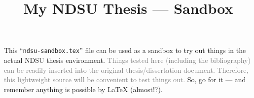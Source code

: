\documentclass[12pt,chapterrefs]{ndsu-thesis-2022}
\title{\vspace{-9pt}My NDSU Thesis --- Sandbox}
\begin{document}

This ``\texttt{ndsu-sandbox.tex}'' file can be used as a sandbox to try out things in the actual NDSU thesis environment. \textcolor{gray}{Things tested here (including the bibliography) can be readily inserted into the original thesis/dissertation document. Therefore, this lightweight source will be convenient to test things out.} So, go for it --- and remember anything is possible by \LaTeX{} (almost!?).

\nocite{*}
%
%



\makerefs %


\closeappendices  %
\end{document}
